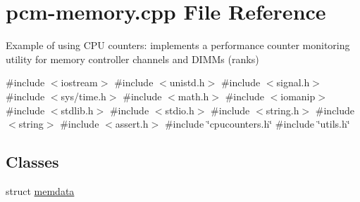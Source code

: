 \hypertarget{pcm-memory_8cpp}{}\section{pcm-\/memory.cpp File Reference}
\label{pcm-memory_8cpp}


Example of using C\+PU counters\+: implements a performance counter monitoring utility for memory controller channels and D\+I\+M\+Ms (ranks)  


{\ttfamily \#include $<$iostream$>$}\newline
{\ttfamily \#include $<$unistd.\+h$>$}\newline
{\ttfamily \#include $<$signal.\+h$>$}\newline
{\ttfamily \#include $<$sys/time.\+h$>$}\newline
{\ttfamily \#include $<$math.\+h$>$}\newline
{\ttfamily \#include $<$iomanip$>$}\newline
{\ttfamily \#include $<$stdlib.\+h$>$}\newline
{\ttfamily \#include $<$stdio.\+h$>$}\newline
{\ttfamily \#include $<$string.\+h$>$}\newline
{\ttfamily \#include $<$string$>$}\newline
{\ttfamily \#include $<$assert.\+h$>$}\newline
{\ttfamily \#include \char`\"{}cpucounters.\+h\char`\"{}}\newline
{\ttfamily \#include \char`\"{}utils.\+h\char`\"{}}\newline
\subsection*{Classes}
\begin{DoxyCompactItemize}
\item 
struct \mbox{\hyperlink{structmemdata}{memdata}}
\end{DoxyCompactItemize}
